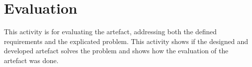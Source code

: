 \chapter{Evaluation}
This activity is for evaluating the artefact, addressing both the defined requirements and the explicated problem. This activity shows if the designed and developed artefact solves the problem and shows how the evaluation of the artefact was done. 





